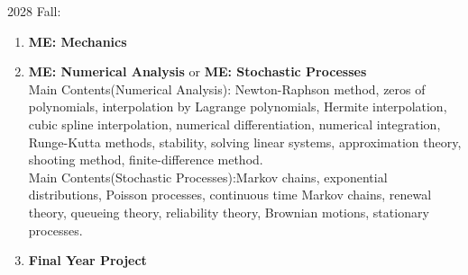 \documentclass{scrartcl}
\begin{document}
2028 Fall:
\begin{enumerate}
    \item \textbf{ME: Mechanics}
    \item \textbf{ME: Numerical Analysis} or \textbf{ME: Stochastic Processes}
    \\Main Contents(Numerical Analysis): Newton-Raphson method, zeros of polynomials,
interpolation by Lagrange polynomials, Hermite interpolation,
cubic spline interpolation, numerical differentiation, numerical
integration, Runge-Kutta methods, stability, solving linear systems,
approximation theory, shooting method, finite-difference method.
    \\Main Contents(Stochastic Processes):Markov chains, exponential distributions,
Poisson processes, continuous time Markov chains, renewal theory,
queueing theory, reliability theory, Brownian motions, stationary
processes.
    \item \textbf{Final Year Project}
\end{enumerate}    
    


\newpage
\end{document}
